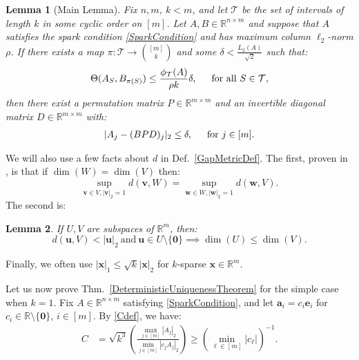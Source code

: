 \documentclass[journal, twocolumn]{IEEEtran}
\newtheorem{lemma}{Lemma}
\begin{document}
\begin{lemma}[Main Lemma]\label{MainLemma}
Fix $n, m$, $k < m$, and let $\mathcal{T}$ be the set of intervals of length $k$ in some cyclic order on $[m]$. Let $A, B \in \mathbb{R}^{n \times m}$ and suppose that $A$ satisfies the spark condition \eqref{SparkCondition} and has maximum column $\ell_2$-norm $\rho$.  If there exists a map $\pi: \mathcal{T} \to {[m] \choose k}$ and some $\delta < \frac{L_{2}(A)}{\sqrt{2}}$ such that: 
\begin{equation}\label{GapUpperBound}
\Theta(A_{S}, B_{\pi(S)}) \leq \frac{ \phi_\mathcal{T}(A) }{\rho k} \delta, \indent \text{for all } S \in \mathcal{T},
\end{equation}
%
then there exist a permutation matrix $P \in \mathbb{R}^{m \times m}$ and an invertible diagonal matrix $D \in \mathbb{R}^{m \times m}$ with:
\begin{align}\label{MainLemmaBPD}
|A_j - (BPD)_j|_2 \leq \delta, \indent \text{for } j \in [m].
\end{align}
\end{lemma}

We will also use a few facts about $d$ in Def.~\ref{GapMetricDef}. The first, proven in \cite[Lem.~3.2]{Morris10}, is that if $\dim(W) = \dim(V)$ then:
\begin{equation}\label{SubspaceMetricSameDim}
\sup_{\mathbf{v} \in V, |\mathbf{v}|_2 = 1}  d(\mathbf{v},W)  = \sup_{\mathbf{w} \in W, |\mathbf{w}|_2 = 1} d(\mathbf{w},V).
\end{equation}
The second is:
\begin{lemma}\label{MinDimLemma}
If $U, V$ are subspaces of $\mathbb{R}^{m}$, then:
\begin{equation*}
d(\mathbf{u},V) < |\mathbf{u}|_2 \ \text{and} \  \mathbf{u} \in U \setminus{\{\mathbf{0}\}} \implies \dim(U) \leq \dim(V).
\end{equation*}
\end{lemma}
%
Finally, we often use $|\mathbf{x}|_1 \leq \sqrt{k} |\mathbf{x}|_2$ for $k$-sparse $\mathbf{x} \in \mathbb{R}^m$.

Let us now prove Thm.~\ref{DeterministicUniquenessTheorem} for the simple case when $k=1$. Fix $A \in \mathbb{R}^{n \times m}$ satisfying \eqref{SparkCondition}, and let $\mathbf{a}_i = c_i \mathbf{e}_i$ for $c_i \in \mathbb{R} \setminus \{\mathbf{0}\}$, $i \in [m]$. By \eqref{Cdef}, we have:
\begin{align}\label{C1}
C 
&= \sqrt{k^3} \left( \frac{\max_{j \in [m]} |A_j|_2}{\min_{j \in [m]}|c_jA_j|_2} \right)
\geq \left( \min_{\ell \in [m]} |c_{\ell}| \right)^{-1}.
\end{align}
\end{document}
